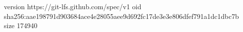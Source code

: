 version https://git-lfs.github.com/spec/v1
oid sha256:aae198791d903684ace4e28055aee9d692fc17de3e3e806dfef791a1dc1dbc7b
size 174940

